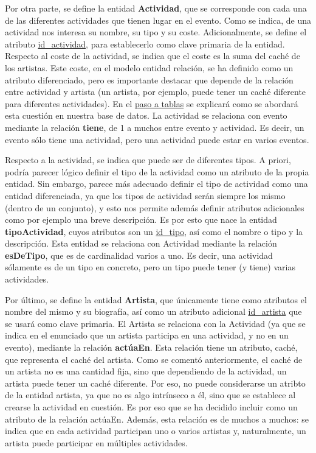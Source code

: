\documentclass[a4paper,onecolumn]{article}
\begin{document}
\begin{sloppypar}
Por otra parte, se define la entidad \textbf{Actividad}, que se corresponde con cada una de las diferentes actividades que tienen lugar en el evento.
Como se indica, de una actividad nos interesa su nombre, su tipo y su coste. Adicionalmente, se define el atributo \underline{id\_actividad}, para 
establecerlo como clave primaria de la entidad. Respecto al coste de la actividad, se indica que el coste es la suma del caché de los artistas. 
Este coste, en el modelo entidad relación, se ha definido como un atributo diferenciado, pero es importante destacar que depende de la relación entre
actividad y artista (un artista, por ejemplo, puede tener un caché diferente para diferentes actividades). En el \hyperref[mr]{paso a tablas} se 
explicará como se abordará esta cuestión en nuestra base de datos. La actividad se relaciona con evento mediante la relación \textbf{tiene}, de 1 a 
muchos entre evento y actividad. Es decir, un evento sólo tiene una actividad, pero una actividad puede estar en varios eventos.

Respecto a la actividad, se indica que puede ser de diferentes tipos. A priori, podría parecer lógico definir el tipo de la actividad como un atributo 
de la propia entidad. Sin embargo, parece más adecuado definir el tipo de actividad como una entidad diferenciada, ya que los tipos de actividad 
serán siempre los mismo (dentro de un conjunto), y esto nos permite además definir atributos adicionales como por ejemplo una breve descripción. Es 
por esto que nace la entidad \textbf{tipoActividad}, cuyos atributos son un \underline{id\_tipo}, así como el nombre o tipo y la descripción. Esta 
entidad se relaciona con Actividad mediante la relación \textbf{esDeTipo}, que es de cardinalidad varios a uno. Es decir, una actividad sólamente es 
de un tipo en concreto, pero un tipo puede tener (y tiene) varias actividades.

Por último, se define la entidad \textbf{Artista}, que únicamente tiene como atributos el nombre del mismo y su biografía, así como un atributo 
adicional \underline{id\_artista} que se usará como clave primaria. El Artista se relaciona con la Actividad (ya que se indica en el enunciado que 
un artista participa en una actividad, y no en un evento), mediante la relación \textbf{actúaEn}. Esta relación tiene un atributo, caché, que 
representa el caché del artista. Como se comentó anteriormente, el caché de un artista no es una cantidad fija, sino que dependiendo de la actividad, 
un artista puede tener un caché diferente. Por eso, no puede considerarse un atribto de la entidad artista, ya que no es algo intrínseco a él, 
sino que se establece al crearse la actividad en cuestión. Es por eso que se ha decidido incluir como un atributo de la relación actúaEn. Además, esta 
relación es de muchos a muchos: se indica que en cada actividad participan uno o varios artistas y, naturalmente, un artista puede participar
en múltiples actividades.



\end{sloppypar}
\end{document}
